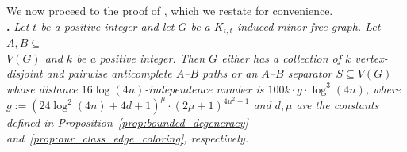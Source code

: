 We now proceed to the proof of , which we restate for convenience.\\[-5pt]


\noindent\textbf{.}\emph{ Let $t$ be a positive integer and let $G$ be a $K_{t,t}$-induced-minor-free graph. Let $A,B \subseteq$\\ $V(G)$ and $k$ be a positive integer. Then $G$ either has a collection of $k$ vertex-disjoint and pairwise anticomplete $A$--$B$ paths or an $A$--$B$ separator $S\subseteq V(G)$ whose distance $16\log (4n)$-independence number is $100 k \cdot g \cdot \log^3 (4n)$, where $g := ( 24 \log^2 (4n) + 4d + 1)^{\mu} \cdot (2\mu +1)^{4\mu^2+1}$ and $d, \mu$ are the constants defined in Proposition~\ref{prop:bounded_degeneracy} and~\ref{prop:our_class_edge_coloring}, respectively. }

